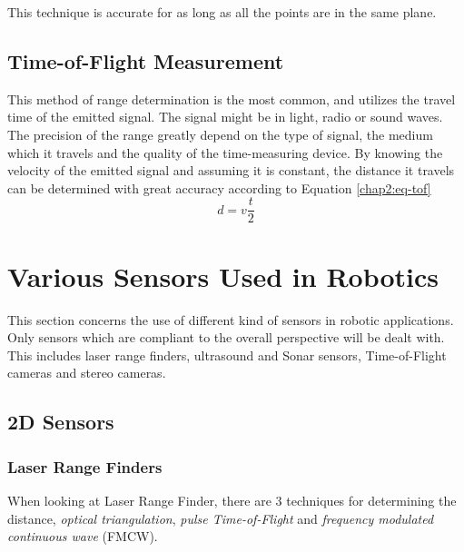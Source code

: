 This technique is accurate for as long as all the points are in the same plane.


\subsection{Time-of-Flight Measurement}
This method of range determination is the most common, and utilizes the travel time of the
emitted signal. The signal might be in light, radio or sound waves. The precision of the
range greatly depend on the type of signal, the medium which it travels and the quality of
the time-measuring device. By knowing the velocity of the emitted signal and assuming it
is constant, the distance it travels can be determined with great accuracy according to 
Equation \eqref{chap2:eq-tof}
\begin{equation}
    \label{chap2:eq-tof}
    d = v \frac{t}{2}
\end{equation}



\section{Various Sensors Used in Robotics}
This section concerns the use of different kind of sensors in robotic applications. Only
sensors which are compliant to the overall perspective will be dealt with. This includes
laser range finders, ultrasound and Sonar sensors, Time-of-Flight cameras and
stereo cameras. 

\subsection{2D Sensors}

\subsubsection{Laser Range Finders}


When looking at Laser Range Finder, there are 3 techniques for determining the distance,
\emph{optical triangulation}, \emph{pulse Time-of-Flight} and \emph{frequency modulated
continuous wave} (FMCW). \cite{laser-ranging-critical-review}

